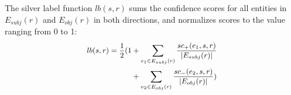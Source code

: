%
%
%
The silver label function $lb(s, r)$ sums the confidence scores for
all entities in $E_{subj}(r)$ and $E_{obj}(r)$ in both directions,
and normalizes scores to the value ranging from 0 to 1:
\begin{equation}
\small
\begin{aligned}
  lb(s, r) = \frac{1}{2} (1 & + \sum\limits_{e_1 \in E_{subj}(r)} { \frac {sc_+(e_1, s, r)} { \left| E_{subj}(r) \right| } } \\
             & + \sum\limits_{e_2 \in E_{obj}(r)} { \frac {sc_-(e_2, s, r)} { \left| E_{obj}(r) \right| } })
\end{aligned}
\end{equation}


